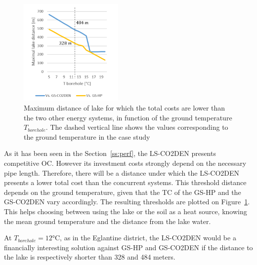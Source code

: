 \documentclass{article}
\begin{document}
\begin{figure} 
	\vspace{-20pt}
	\centering
	\includegraphics[width=0.45\textwidth]{lakeDist.png}
	\caption{Maximum distance of lake for which the total costs are lower than the two other energy systems, in function of the ground temperature $T_{borehole}$. The dashed vertical line shows the values corresponding to the ground temperature in the case study}
	\label{fig:lakeDist}
	\vspace{-10pt}
\end{figure}

As it has been seen in the Section~\ref{ss:perf}, the LS-CO2DEN presents competitive OC. However its investment costs strongly depend on the necessary pipe length. Therefore, there will be a distance under which the LS-CO2DEN presents a lower total cost than the concurrent systems. This threshold distance depends on the ground temperature, given that the TC of the GS-HP and the GS-CO2DEN vary accordingly. The resulting thresholds are plotted on Figure~\ref{fig:lakeDist}. This helps choosing between using the lake or the soil as a heat source, knowing the mean ground temperature and the distance from the lake water.


At $T_{borehole} = 12 \si{\celsius}$, as in the Eglantine district, the LS-CO2DEN would be a financially interesting solution against  GS-HP and GS-CO2DEN if the distance to the lake is respectively shorter than 328 and 484 meters.
\end{document}
